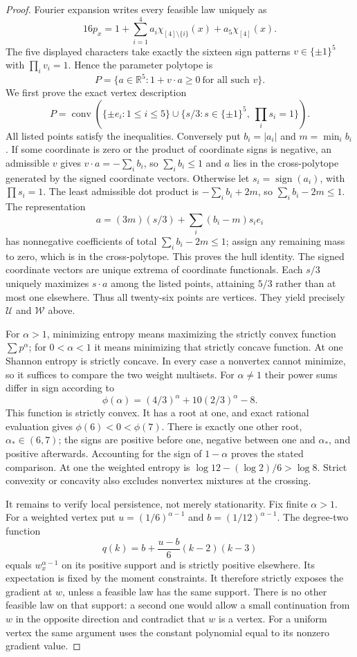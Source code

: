 \documentclass[11pt]{article}
\begin{document}
\begin{proof}
Fourier expansion writes every feasible law uniquely as
\[
 16p_x=1+\sum_{i=1}^4a_i\chi_{[4]\setminus\{i\}}(x)
                   +a_5\chi_{[4]}(x).
\]
The five displayed characters take exactly the sixteen sign patterns
$v\in\{\pm1\}^5$ with $\prod_i v_i=1$. Hence the parameter polytope is
\[
 P=\{a\in\mathbb R^5:1+v\cdot a\ge0\ \text{for all such }v\}.
\]
We first prove the exact vertex description
\[
 P=\operatorname{conv}\left(
 \{\pm e_i:1\le i\le5\}
 \cup\{s/3:s\in\{\pm1\}^5,\ \prod_i s_i=1\}\right).
\]
All listed points satisfy the inequalities. Conversely put
$b_i=|a_i|$ and $m=\min_i b_i$. If some coordinate is zero or the
product of coordinate signs is negative, an admissible $v$ gives
$v\cdot a=-\sum_i b_i$, so $\sum_i b_i\le1$ and $a$ lies in the
cross-polytope generated by the signed coordinate vectors.
Otherwise let $s_i=\operatorname{sign}(a_i)$, with $\prod s_i=1$.
The least admissible dot product is $-\sum_i b_i+2m$, so
$\sum_i b_i-2m\le1$. The representation
\[
 a=(3m)(s/3)+\sum_i(b_i-m)s_i e_i
\]
has nonnegative coefficients of total $\sum_i b_i-2m\le1$;
assign any remaining mass to zero, which is in the cross-polytope.
This proves the hull identity. The signed coordinate vectors are
unique extrema of coordinate functionals. Each $s/3$ uniquely maximizes
$s\cdot a$ among the listed points, attaining $5/3$ rather than at
most one elsewhere. Thus all twenty-six points are vertices.
They yield precisely $\mathcal U$ and $\mathcal W$ above.

For $\alpha>1$, minimizing entropy means maximizing the strictly
convex function $\sum p^\alpha$; for $0<\alpha<1$ it means minimizing
that strictly concave function. At one Shannon entropy is strictly
concave. In every case a nonvertex cannot minimize, so it suffices
to compare the two weight multisets. For $\alpha\ne1$ their power sums
differ in sign according to
\[
 \phi(\alpha)=(4/3)^\alpha+10(2/3)^\alpha-8.
\]
This function is strictly convex. It has a root at one, and exact
rational evaluation gives $\phi(6)<0<\phi(7)$. There is exactly
one other root, $\alpha_*\in(6,7)$; the signs are positive before
one, negative between one and $\alpha_*$, and positive afterwards.
Accounting for the sign of $1-\alpha$ proves the stated comparison.
At one the weighted entropy is
$\log12-(\log2)/6>\log8$. Strict convexity or concavity also excludes
nonvertex mixtures at the crossing.

It remains to verify local persistence, not merely stationarity.
Fix finite $\alpha>1$. For a weighted vertex put
$u=(1/6)^{\alpha-1}$ and $b=(1/12)^{\alpha-1}$. The degree-two function
\[
 q(k)=b+\frac{u-b}{6}(k-2)(k-3)
\]
equals $w_x^{\alpha-1}$ on its positive support and is strictly
positive elsewhere. Its expectation is fixed by the moment constraints.
It therefore strictly exposes the gradient at $w$, unless a feasible
law has the same support. There is no other feasible law on that
support: a second one would allow a small continuation from $w$ in
the opposite direction and contradict that $w$ is a vertex.
For a uniform vertex the same argument uses the constant polynomial
equal to its nonzero gradient value.


\end{proof}
\end{document}
